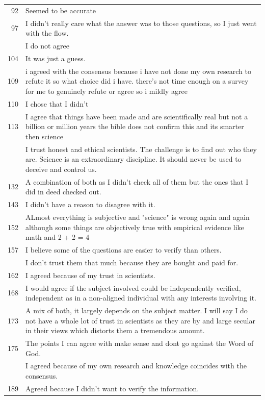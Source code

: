 \documentclass[
  doc,floatsintext]{apa6}
\begin{document}
\begin{longtable}[t]{>{}r>{\raggedright\arraybackslash}p{30em}}
92 & Seemed to be accurate\\
97 & I didn't really care what the answer was to those questions, so I just went with the flow.\\
\addlinespace
99 & I do not agree\\
104 & It was just a guess.\\
109 & i agreed with the consensus because i have not done my own research to refute it so what choice did i have. there’s not time enough on a survey for me to genuinely refute or agree so i mildly agree\\
110 & I chose that I didn’t\\
113 & I agree that things have been made and are scientifically real but not a billion or million years the bible does not confirm this and its smarter then science\\
\addlinespace
130 & I trust honest and ethical scientists.  The challenge is to find out who they are.  Science is an extraordinary discipline.  It should never be used to deceive and control us.\\
132 & A combination of both as I didn't check all of them but the ones that I did in deed checked out.\\
143 & I didn't have a reason to disagree with it.\\
152 & ALmost everything is subjective and "science" is wrong again and again although some things are objectively true with empirical evidence like math and 2 + 2 = 4\\
157 & I believe some of the questions are easier to verify than others.\\
\addlinespace
158 & I don't trust them that much because they are bought and paid for.\\
162 & I agreed because of my trust in scientists.\\
168 & I would agree if the subject involved could be independently verified, independent as in a non-aligned individual with any interests involving it.\\
173 & A mix of both, it largely depends on the subject matter. I will say I do not have a whole lot of trust in scientists as they are by and large secular in their views which distorts them a tremendous amount.\\
175 & The points I can agree with make sense and dont go against the Word of God.\\
\addlinespace
187 & I agreed because of my own research and knowledge coincides with the consensus.\\
189 & Agreed because I didn’t want to verify the information.\\
\bottomrule
\end{longtable}
\end{document}
